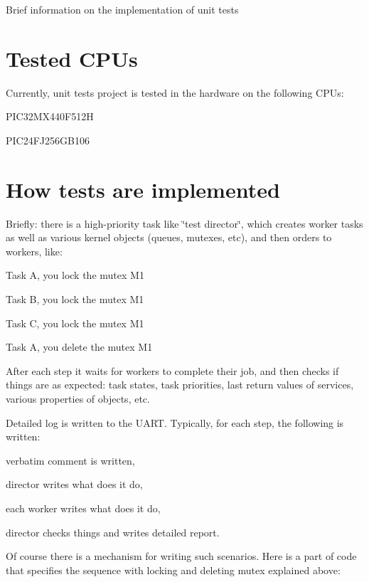 Brief information on the implementation of unit tests\hypertarget{unit_tests_tested_cpus}{}\section{Tested C\+P\+Us}\label{unit_tests_tested_cpus}
Currently, unit tests project is tested in the hardware on the following C\+P\+Us\+:


\begin{DoxyItemize}
\item P\+I\+C32\+M\+X440\+F512H
\item P\+I\+C24\+F\+J256\+G\+B106
\end{DoxyItemize}\hypertarget{unit_tests_how_tests_are_implemented}{}\section{How tests are implemented}\label{unit_tests_how_tests_are_implemented}
Briefly\+: there is a high-\/priority task like \char`\"{}test director\char`\"{}, which creates worker tasks as well as various kernel objects (queues, mutexes, etc), and then orders to workers, like\+:


\begin{DoxyItemize}
\item Task A, you lock the mutex M1
\item Task B, you lock the mutex M1
\item Task C, you lock the mutex M1
\item Task A, you delete the mutex M1
\end{DoxyItemize}

After each step it waits for workers to complete their job, and then checks if things are as expected\+: task states, task priorities, last return values of services, various properties of objects, etc.

Detailed log is written to the U\+A\+RT. Typically, for each step, the following is written\+:


\begin{DoxyItemize}
\item verbatim comment is written,
\item director writes what does it do,
\item each worker writes what does it do,
\item director checks things and writes detailed report.
\end{DoxyItemize}

Of course there is a mechanism for writing such scenarios. Here is a part of code that specifies the sequence with locking and deleting mutex explained above\+:


